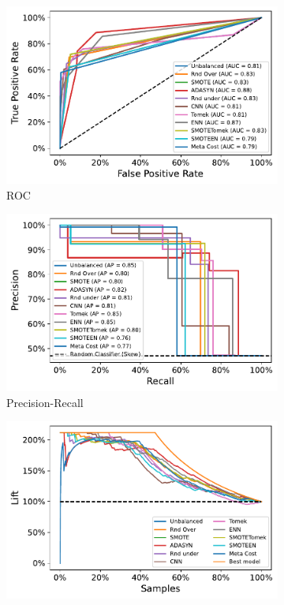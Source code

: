 \documentclass[10pt, a4paper, twocolumn]{article}
\begin{document}
\begin{figure}
    \centering
    \begin{subfigure}[t]{0.49\linewidth}
        \includegraphics[width=\linewidth]{immagini simone/imb_roc_comparison.pdf}
        \caption{ROC}
        \label{fig:imbroc}
    \end{subfigure}
    \hfill%
    \begin{subfigure}[t]{0.49\columnwidth}
        \includegraphics[width=\linewidth]{immagini simone/imb_pre_rec_comparison.pdf}
        \caption{Precision-Recall}
        \label{fig:imbprerec}
    \end{subfigure}
    \begin{subfigure}[t]{0.49\linewidth}
        \includegraphics[width=\linewidth]{immagini simone/imb_lift_comparison.pdf}

\end{subfigure}
\end{figure}
\end{document}
